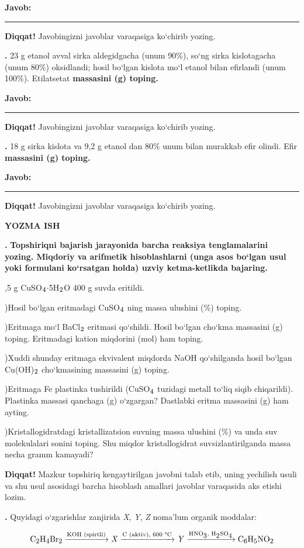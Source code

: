 \documentclass[11pt,a4paper]{article}
\renewcommand{\textsubscript}[1]{\ensuremath{_{\text{\fontsize{8}{8}\selectfont #1}}}}
\newcommand{\qn}[1]{\textbf{\fontsize{11.5}{13}\selectfont #1}}
\newcommand{\qsep}{\par\vspace{1pt}\noindent\rule{0pt}{0.4pt}\par\vspace{5pt}}
\newcommand{\diqqat}[1]{\par\smallskip\noindent\textbf{Diqqat!} #1\par\medskip}
\newcommand{\javob}{\par\smallskip\noindent\textbf{Javob:} \rule[-2pt]{7.5cm}{0.4pt}\par\smallskip\noindent\textbf{Diqqat!} Javobingizni javoblar varaqasiga ko`chirib yozing.\par\medskip}
\begin{document}
\javob\qsep
\noindent\qn{39.} 23 g etanol avval sirka aldegidgacha (unum 90\%), so`ng sirka kislotagacha (unum 80\%) oksidlandi; hosil bo`lgan kislota mo`l etanol bilan efirlandi (unum 100\%). Etilatsetat \textbf{massasini (g) toping.}
\javob\qsep
\noindent\qn{40.} 18 g sirka kislota va 9,2 g etanol dan 80\% unum bilan murakkab efir olindi. Efir \textbf{massasini (g) toping.}
\javob\qsep
\par\bigskip\begin{center}\textbf{\fontsize{13}{15}\selectfont YOZMA ISH}\end{center}
\noindent\qn{41.} \textbf{Topshiriqni bajarish jarayonida barcha reaksiya tenglamalarini yozing. Miqdoriy va arifmetik hisoblashlarni (unga asos bo`lgan usul yoki formulani ko`rsatgan holda) uzviy ketma-ketlikda bajaring.}\par{},5 g CuSO\textsubscript{4}$\cdot$5H\textsubscript{2}O 400 g suvda eritildi.\par
{})Hosil bo`lgan eritmadagi CuSO\textsubscript{4} ning massa ulushini (\%) toping.\par
{})Eritmaga mo`l BaCl\textsubscript{2} eritmasi qo`shildi. Hosil bo`lgan cho`kma massasini (g) toping. Eritmadagi kation miqdorini (mol) ham toping.\par
{})Xuddi shunday eritmaga ekvivalent miqdorda NaOH qo`shilganda hosil bo`lgan Cu(OH)\textsubscript{2} cho`kmasining massasini (g) toping.\par
{})Eritmaga Fe plastinka tushirildi (CuSO\textsubscript{4} tuzidagi metall to`liq siqib chiqarildi). Plastinka massasi qanchaga (g) o`zgargan? Dastlabki eritma massasini (g) ham ayting.\par
{})Kristallogidratdagi kristallizatsion suvning massa ulushini (\%) va unda suv molekulalari sonini toping. Shu miqdor kristallogidrat suvsizlantirilganda massa necha gramm kamayadi?\par
\diqqat{Mazkur topshiriq kengaytirilgan javobni talab etib, uning yechilish usuli va shu usul asosidagi barcha hisoblash amallari javoblar varaqasida aks etishi lozim.}\qsep
\noindent\qn{42.} Quyidagi o`zgarishlar zanjirida \textit{X}, \textit{Y}, \textit{Z} noma'lum organik moddalar:\par
\[\setlength{\fboxsep}{0pt}\text{C\textsubscript{2}H\textsubscript{4}Br\textsubscript{2}}\xrightarrow{\text{KOH (spirtli)}}\text{\textit{X}}\xrightarrow{\text{C (aktiv), 600 \textdegree{}C}}\text{\textit{Y}}\xrightarrow{\text{HNO\textsubscript{3}, H\textsubscript{2}SO\textsubscript{4}}}\text{C\textsubscript{6}H\textsubscript{5}NO\textsubscript{2}}\]
\end{document}
